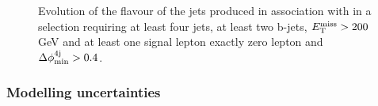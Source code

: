 \begin{figure}[htb]
\centering 
{}
\caption{Evolution of the flavour of the jets produced in association with \ttbar in a selection requiring at least four jets, at least two b-jets, $E_{\rm T}^{\mathrm{miss}}>200$ GeV and  at least one signal lepton  exactly zero lepton and $\Delta\phi_{\rm{min}}^{4{\rm{j}}} > 0.4$.}\label{fig:ttbar_HF_bjets}
\end{figure}


\subsubsection*{Modelling uncertainties}

